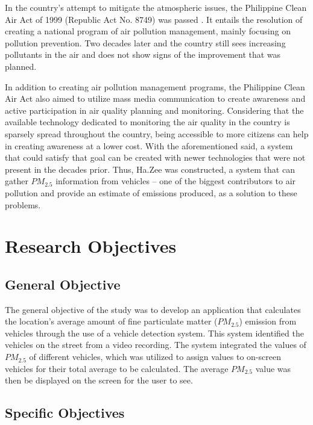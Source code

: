 In the country’s attempt to mitigate the atmospheric issues, the Philippine Clean Air Act of 1999 (Republic Act No. 8749) was passed \cite{FAO}. It entails the resolution of creating a national program of air pollution management, mainly focusing on pollution prevention. Two decades later and the country still sees increasing pollutants in the air and does not show signs of the improvement that was planned.

In addition to creating air pollution management programs, the Philippine Clean Air Act also aimed to utilize mass media communication to create awareness and active participation in air quality planning and monitoring. Considering that the available technology dedicated to monitoring the air quality in the country is sparsely spread throughout the country, being accessible to more citizens can help in creating awareness at a lower cost. With the aforementioned said, a system that could satisfy that goal can be created with newer technologies that were not present in the decades prior. Thus, Ha.Zee was constructed, a system that can gather $PM_{2.5}$ information from vehicles – one of the biggest contributors to air pollution and provide an estimate of emissions produced, as a solution to these problems. 


\section{Research Objectives}
\label{sec:researchobjectives}

\subsection{General Objective}
\label{sec:generalobjective}


The general objective of the study was to develop an application that calculates the location’s average amount of  fine particulate matter ($PM_{2.5}$) emission from vehicles through the use of a vehicle detection system. This system identified the vehicles on the street from a video recording. The system integrated the values of $PM_{2.5}$  of different vehicles, which was utilized to assign values to on-screen vehicles for their total average to be calculated. The average $PM_{2.5}$ value was then be displayed on the screen for the user to see.



\subsection{Specific Objectives}
\label{sec:specificobjectives}

